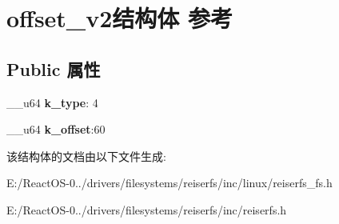 \hypertarget{structoffset__v2}{}\section{offset\+\_\+v2结构体 参考}
\label{structoffset__v2}
\subsection*{Public 属性}
\begin{DoxyCompactItemize}
\item 
\mbox{\label{structoffset__v2_a1eb40a28d091ee3992107d21602ef15c}} 
\+\_\+\+\_\+u64 {\bfseries k\+\_\+type}\+: 4
\item 
\mbox{\label{structoffset__v2_ac164c04be26b32ec227ad0a6b8263817}} 
\+\_\+\+\_\+u64 {\bfseries k\+\_\+offset}\+:60
\end{DoxyCompactItemize}


该结构体的文档由以下文件生成\+:\begin{DoxyCompactItemize}
\item 
E\+:/\+React\+O\+S-\/0../drivers/filesystems/reiserfs/inc/linux/reiserfs\+\_\+fs.\+h\item 
E\+:/\+React\+O\+S-\/0../drivers/filesystems/reiserfs/inc/reiserfs.\+h\end{DoxyCompactItemize}
